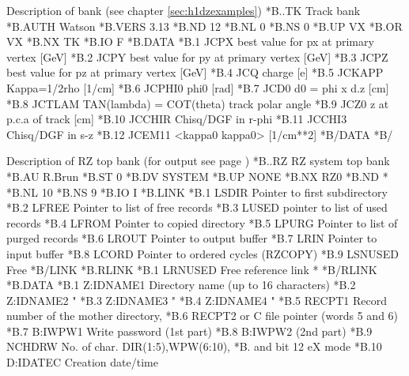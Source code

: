 \begin{landscapebody}
\begin{XMPt}{Description of  bank (see chapter \ref{sec:h1dzexamples})}
*B..TK     Track bank
*B.AUTH    Watson
*B.VERS    3.13
*B.ND      12
*B.NL      0
*B.NS      0
*B.UP      VX
*B.OR      VX
*B.NX      TK
*B.IO      F
*B.DATA
*B.1      JCPX       best value for px at primary vertex    [GeV]
*B.2      JCPY       best value for py at primary vertex    [GeV]
*B.3      JCPZ       best value for pz at primary vertex    [GeV]
*B.4      JCQ        charge                                 [e]
*B.5      JCKAPP     Kappa=1/2rho                           [1/cm]
*B.6      JCPHI0     phi0                                   [rad]
*B.7      JCD0       d0 = phi x d.z                         [cm]
*B.8      JCTLAM     TAN(lambda) = COT(theta) track polar angle
*B.9      JCZ0       z at p.c.a of track                    [cm]
*B.10     JCCHIR     Chisq/DGF in r-phi
*B.11     JCCHI3     Chisq/DGF in s-z
*B.12     JCEM11     <kappa0 kappa0>                    [1/cm**2]
*B/DATA
*B/
\end{XMPt}
\NODOC{\end{minipage}
\hspace*{2mm}
\begin{minipage}[t]{.49\hsize}}
\begin{XMPt}{Description of RZ top bank (for output see page \pageref{xmp:rztop})}
*B..RZ  RZ system top bank
*B.AU   R.Brun
*B.ST   0
*B.DV   SYSTEM
*B.UP   NONE
*B.NX   RZ0
*B.ND   *
*B.NL   10
*B.NS   9
*B.IO   I
*B.LINK
*B.1    LSDIR      Pointer to first subdirectory
*B.2    LFREE      Pointer to list of free records
*B.3    LUSED      pointer to list of used records
*B.4    LFROM      Pointer to copied directory
*B.5    LPURG      Pointer to list of purged records
*B.6    LROUT      Pointer to output buffer
*B.7    LRIN       Pointer to input buffer
*B.8    LCORD      Pointer to ordered cycles (RZCOPY)
*B.9    LSNUSED    Free 
*B/LINK
*B.RLINK
*B.1    LRNUSED    Free reference link                     *
*B/RLINK
*B.DATA
*B.1     Z:IDNAME1     Directory name  (up to 16 characters)    
*B.2     Z:IDNAME2                 "                              
*B.3     Z:IDNAME3                 "                              
*B.4     Z:IDNAME4                 "                              
*B.5     RECPT1        Record number of the mother directory,   
*B.6     RECPT2        or C file pointer (words 5 and 6)        
*B.7     B:IWPW1       Write password (1st part)                
*B.8     B:IWPW2                      (2nd part)                
*B.9     NCHDRW        No. of char. DIR(1:5),WPW(6:10), 
*B.                    and  bit 12 eX mode   
*B.10    D:IDATEC      Creation date/time                       

\end{XMPt}
\end{landscapebody}
